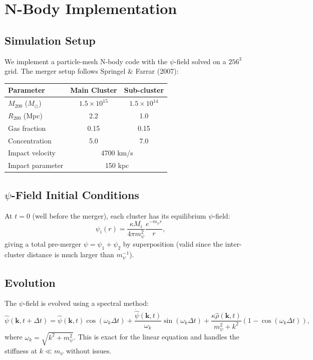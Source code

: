 \documentclass[11pt,a4paper]{article}
\theoremstyle{remark}
\begin{document}
\section{N-Body Implementation}

\subsection{Simulation Setup}

We implement a particle-mesh N-body code with the $\psi$-field solved
on a $256^3$ grid. The merger setup follows Springel \& Farrar (2007):

\begin{center}
\begin{tabular}{lcc}
\toprule
\textbf{Parameter} & \textbf{Main Cluster} & \textbf{Sub-cluster} \\
\midrule
$M_{200}$ ($M_\odot$) & $1.5 \times 10^{15}$ & $1.5 \times 10^{14}$ \\
$R_{200}$ (Mpc) & 2.2 & 1.0 \\
Gas fraction & 0.15 & 0.15 \\
Concentration & 5.0 & 7.0 \\
Impact velocity & \multicolumn{2}{c}{4700 km/s} \\
Impact parameter & \multicolumn{2}{c}{150 kpc} \\
\bottomrule
\end{tabular}
\end{center}

\subsection{$\psi$-Field Initial Conditions}

At $t = 0$ (well before the merger), each cluster has its equilibrium
$\psi$-field:
\begin{equation}
\psi_i(r) = \frac{\kappa M_i}{4\pi m_\psi^2}\frac{e^{-m_\psi r}}{r},
\end{equation}
giving a total pre-merger $\psi = \psi_1 + \psi_2$ by superposition
(valid since the inter-cluster distance is much larger than $m_\psi^{-1}$).

\subsection{Evolution}

The $\psi$-field is evolved using a spectral method:
\begin{equation}
\hat\psi(\mathbf{k}, t+\Delta t) = \hat\psi(\mathbf{k}, t)\cos(\omega_k\Delta t)
+ \frac{\dot{\hat\psi}(\mathbf{k}, t)}{\omega_k}\sin(\omega_k\Delta t)
+ \frac{\kappa\hat\rho(\mathbf{k}, t)}{m_\psi^2 + k^2}(1 - \cos(\omega_k\Delta t)),
\end{equation}
where $\omega_k = \sqrt{k^2 + m_\psi^2}$. This is exact for the linear
equation and handles the stiffness at $k \ll m_\psi$ without issues.
\end{document}
